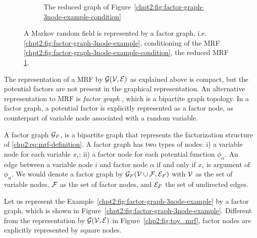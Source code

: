 \begin{figure}[!t]
\begin{subfigure}{.3\textwidth}
    \caption{The reduced graph of Figure~\ref{chpt2:fig:factor-graph-3node-example-condition}}
    \label{chpt2:fig:factor-graph-3node-example-reduced}
  \end{subfigure}
  
  \caption{A Markov random field is represented by a factor graph, i.e. \ref{chpt2:fig:factor-graph-3node-example}, conditioning of the MRF \ref{chpt2:fig:factor-graph-3node-example-condition}, the reduced MRF \ref{chpt2:fig:factor-graph-3node-example-reduced}.}
  \label{chp2:tab:toy-factor-graph}
  \hspace{1cm}
\end{figure}


The representation of a MRF by $\mathcal{G}(\mathcal{V}, \mathcal{E})$ as explained above is compact, but the potential factors are not present in the graphical representation. An alternative representation to MRF is \textit{factor graph} \cite{kschischang2001factor_graph},
which is a bipartite graph topology. In a factor graph, a potential factor is explicitly represented as a factor node, as counterpart of variable node associated with a random variable.
\begin{definition}\label{chpt2:def:factor-graph}
  A factor graph $\mathcal{G}_F$, is a bipartite graph that represents the factorization structure of \eqref{chp2:eq:mrf-definition}. A factor graph has two types of nodes: i) a variable node for each variable $x_i$; ii) a factor node for each potential function $\phi_{\alpha}$. An edge between a variable node $i$ and factor node $\alpha$ if and only if $x_i$ is argument of $\phi_{\alpha}$. We would denote a factor graph by $\mathcal{G}_F(\mathcal{V} \cup \mathcal{F}, \mathcal{E}_F)$ with $\mathcal{V}$ as the set of variable nodes, $\mathcal{F}$ as the set of factor nodes, and $\mathcal{E}_F$ the set of undirected edges.
\end{definition}
\begin{example}
  Let us represent the Example~\ref{chpt2:fig:factor-graph-3node-example} by a factor graph, which is shown in Figure~\ref{chpt2:fig:factor-graph-3node-example}. Different from the representation by $\mathcal{G}(\mathcal{V}, \mathcal{E})$ in Figure~\ref{chp2:fig:toy_mrf}, factor nodes are explicitly represented by square nodes.
\end{example}


